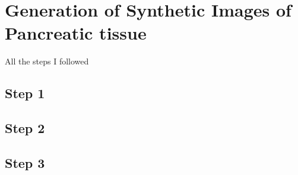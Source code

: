 \section{Generation of Synthetic Images of Pancreatic tissue}
All the steps I followed

\subsection{Step 1}

\subsection{Step 2}

\subsection{Step 3}

